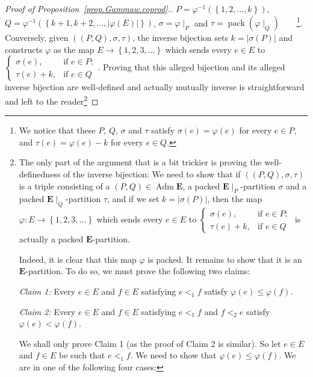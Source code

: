 \documentclass[12pt]{article}
\theoremstyle{plain}
\theoremstyle{definition}
\theoremstyle{remark}
\newcommand{\Adm}{\operatorname{Adm}}
\newcommand{\pack}{\operatorname{pack}}
\newcommand{\EE}{{\mathbf{E}}}
\begin{document}
\begin{proof}[Proof of Proposition~\ref{prop.Gammaw.coprod}.]
$P = \varphi^{-1}\left(\left\{1, 2, \ldots, k\right\}\right)$,
$Q = \varphi^{-1}\left(\left\{k+1, k+2, \ldots, \left|\varphi\left(E\right)\right|\right\}\right)$,
$\sigma = \varphi\mid_P$ and
$\tau = \pack \left(\varphi\mid_Q\right)$\ \ \ \ \footnote{We
notice that these $P$, $Q$, $\sigma$ and $\tau$ satisfy
$\sigma\left(e\right) = \varphi\left(e\right)$ for every
$e \in P$, and $\tau\left(e\right) = \varphi\left(e\right) - k$
for every $e \in Q$.}. Conversely, given
$\left(\left(P, Q\right), \sigma, \tau\right)$,
the inverse bijection
sets $k = \left|\sigma\left(P\right)\right|$ and constructs
$\varphi$ as the map $E \to \left\{1, 2, 3, \ldots\right\}$
which sends every $e \in E$ to
$\begin{cases} \sigma\left(e\right), &\mbox{if } e \in P; \\
\tau\left(e\right) + k, &\mbox{if } e \in Q \end{cases}$.
Proving that this alleged bijection and its alleged inverse
bijection are well-defined and actually mutually inverse is
straightforward and left to the reader\footnote{The only
part of the argument that is a bit trickier is proving the
well-definedness of the inverse bijection: We need to show
that if $\left(\left(P, Q\right), \sigma, \tau
\right)$ is a triple consisting of a
$\left(P, Q\right) \in \Adm \EE$, a packed
$\EE\mid_P$-partition $\sigma$ and a packed $\EE\mid_Q$-partition
$\tau$, and if we set $k = \left|\sigma\left(P\right)\right|$,
then the map $\varphi : E \to \left\{1, 2, 3, \ldots\right\}$
which sends every $e \in E$ to
$\begin{cases} \sigma\left(e\right), &\mbox{if } e \in P; \\
\tau\left(e\right) + k, &\mbox{if } e \in Q \end{cases}$
is actually a packed $\EE$-partition.

Indeed, it is clear that this map $\varphi$ is packed. It remains
to show that it is an $\EE$-partition. To do so, we must prove
the following two claims:

\textit{Claim 1:} Every $e \in E$ and $f \in E$ satisfying
$e <_1 f$ satisfy
$\varphi\left(e\right) \leq \varphi\left(f\right)$.

\textit{Claim 2:} Every $e \in E$ and $f \in E$ satisfying
$e <_1 f$ and $f <_2 e$ satisfy
$\varphi\left(e\right) < \varphi\left(f\right)$.

We shall only prove Claim 1 (as the proof of Claim 2 is
similar). So let $e \in E$ and $f \in E$ be such that
$e <_1 f$. We need to show that
$\varphi\left(e\right) \leq \varphi\left(f\right)$.
We are in one of the following four cases:

}
\end{proof}
\end{document}
